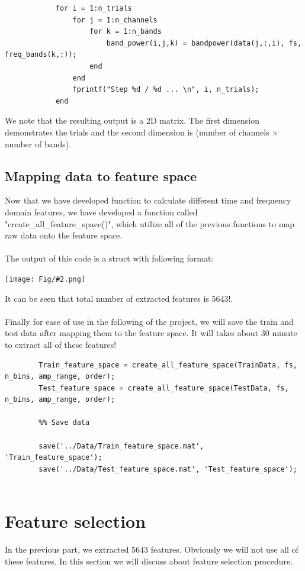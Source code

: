 \documentclass[]{article}
\newcommand{\pict}[2]{\begin{center}
		\texttt{[image: Fig/\#2.png]}
\end{center}}
\begin{document}
\begin{enumerate}
\begin{lstlisting}
			for i = 1:n_trials
				for j = 1:n_channels
					for k = 1:n_bands
						band_power(i,j,k) = bandpower(data(j,:,i), fs, freq_bands(k,:));
					end
				end
				fprintf("Step %d / %d ... \n", i, n_trials);
			end
		\end{lstlisting}
		We note that the resulting output is a 2D matrix. The first dimension demonstrates the trials and the second dimension is (number of channels $\times$ number of bands).
	\end{enumerate}

	\subsection{Mapping data to feature space}
	Now that we have developed function to calculate different time and frequency domain features, we have developed a function called "create\_all\_feature\_space()", which utilize all of the previous functions to map raw data onto the feature space.\\\\
	The output of this code is a struct with following format:
	\pict{0.5}{F3}
	It can be seen that total number of extracted features is 5643!.\\\\
	Finally for ease of use in the following of the project, we will save the train and test data after mapping them to the feature space. It will takes about 30 minute to extract all of these features!
	
	\begin{lstlisting}
		Train_feature_space = create_all_feature_space(TrainData, fs, n_bins, amp_range, order);
		Test_feature_space = create_all_feature_space(TestData, fs, n_bins, amp_range, order);
		
		%% Save data
		
		save('../Data/Train_feature_space.mat', 'Train_feature_space');
		save('../Data/Test_feature_space.mat', 'Test_feature_space');
		
	\end{lstlisting}
	\section{Feature selection}
	In the previous part, we extracted 5643 features. Obviously we will not use all of these features. In this section we will discuss about feature selection procedure.
	
\end{document}
